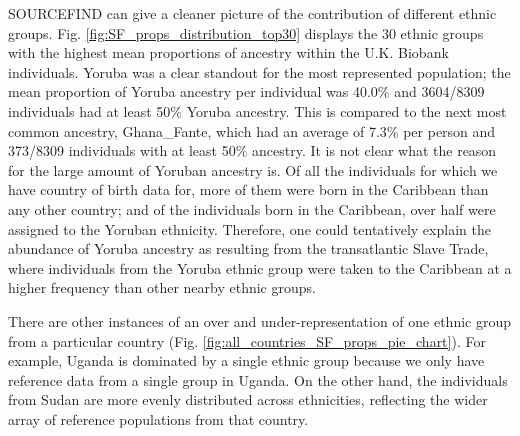 SOURCEFIND can give a cleaner picture of the contribution of different ethnic groups. Fig. \ref{fig:SF_props_distribution_top30} displays the 30 ethnic groups with the highest mean proportions of ancestry within the U.K. Biobank individuals. Yoruba was a clear standout for the most represented population; the mean proportion of Yoruba ancestry per individual was 40.0\% and 3604/8309 individuals had at least 50\% Yoruba ancestry. This is compared to the next most common ancestry, Ghana\_Fante, which had an average of 7.3\% per person and 373/8309 individuals with at least 50\% ancestry. It is not clear what the reason for the large amount of Yoruban ancestry is. Of all the individuals for which we have country of birth data for, more of them were born in the Caribbean than any other country; and of the individuals born in the Caribbean, over half were assigned to the Yoruban ethnicity. Therefore, one could tentatively explain the abundance of Yoruba ancestry as resulting from the transatlantic Slave Trade, where individuals from the Yoruba ethnic group were taken to the Caribbean at a higher frequency than other nearby ethnic groups.  

There are other instances of an over and under-representation of one ethnic group from a particular country (Fig. \ref{fig:all_countries_SF_props_pie_chart}). For example, Uganda is dominated by a single ethnic group because we only have reference data from a single group in Uganda. On the other hand, the individuals from Sudan are more evenly distributed across ethnicities, reflecting the wider array of reference populations from that country. 

